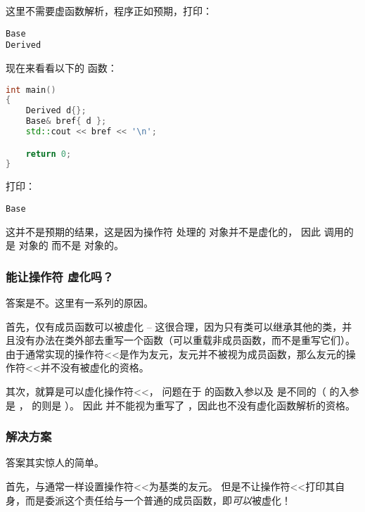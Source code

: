 \documentclass[../../LearnCpp.tex]{subfiles}
\begin{document}
这里不需要虚函数解析，程序正如预期，打印：

\begin{lstlisting}
Base
Derived
\end{lstlisting}

现在来看看以下的  函数：

\begin{lstlisting}[language=C++]
int main()
{
    Derived d{};
    Base& bref{ d };
    std::cout << bref << '\n';

    return 0;
}
\end{lstlisting}

打印：

\begin{lstlisting}
Base
\end{lstlisting}

这并不是预期的结果，这是因为操作符 \acode{<<} 处理的  对象并不是虚化的，
因此  调用的是  对象的 \acode{<<} 而不是  对象的。

\subsubsection*{能让操作符 \acode{<<} 虚化吗？}

答案是不。这里有一系列的原因。

首先，仅有成员函数可以被虚化 --
这很合理，因为只有类可以继承其他的类，并且没有办法在类外部去重写一个函数（可以重载非成员函数，而不是重写它们）。
由于通常实现的操作符<<是作为友元，友元并不被视为成员函数，那么友元的操作符<<并不没有被虚化的资格。

其次，就算是可以虚化操作符<<，
问题在于  的函数入参以及  是不同的（ 的入参是 ，
 的则是 ）。
因此  并不能视为重写了 ，因此也不没有虚化函数解析的资格。

\subsubsection*{解决方案}

答案其实惊人的简单。

首先，与通常一样设置操作符<<为基类的友元。
但是不让操作符<<打印其自身，而是委派这个责任给与一个普通的成员函数，即\textit{可以}被虚化！
\end{document}
